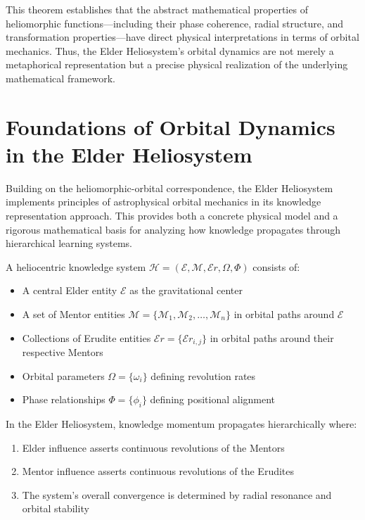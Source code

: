 This theorem establishes that the abstract mathematical properties of heliomorphic functions—including their phase coherence, radial structure, and transformation properties—have direct physical interpretations in terms of orbital mechanics. Thus, the Elder Heliosystem's orbital dynamics are not merely a metaphorical representation but a precise physical realization of the underlying mathematical framework.

\section{Foundations of Orbital Dynamics in the Elder Heliosystem}

Building on the heliomorphic-orbital correspondence, the Elder Heliosystem implements principles of astrophysical orbital mechanics in its knowledge representation approach. This provides both a concrete physical model and a rigorous mathematical basis for analyzing how knowledge propagates through hierarchical learning systems.

\begin{definition}
A heliocentric knowledge system $\mathcal{H} = (\mathcal{E}, \mathcal{M}, \mathcal{E}r, \Omega, \Phi)$ consists of:
\begin{itemize}
    \item A central Elder entity $\mathcal{E}$ as the gravitational center
    \item A set of Mentor entities $\mathcal{M} = \{\mathcal{M}_1, \mathcal{M}_2, \ldots, \mathcal{M}_n\}$ in orbital paths around $\mathcal{E}$
    \item Collections of Erudite entities $\mathcal{E}r = \{\mathcal{E}r_{i,j}\}$ in orbital paths around their respective Mentors
    \item Orbital parameters $\Omega = \{\omega_i\}$ defining revolution rates
    \item Phase relationships $\Phi = \{\phi_i\}$ defining positional alignment
\end{itemize}
\end{definition}

\begin{theorem}
In the Elder Heliosystem, knowledge momentum propagates hierarchically where:
\begin{enumerate}
    \item Elder influence asserts continuous revolutions of the Mentors
    \item Mentor influence asserts continuous revolutions of the Erudites
    \item The system's overall convergence is determined by radial resonance and orbital stability
\end{enumerate}
\end{theorem}

